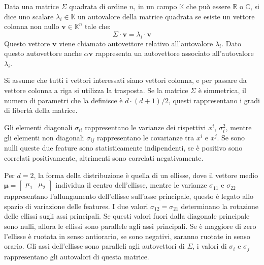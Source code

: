 \documentclass{article}
\numberwithin{equation}{subsection}
\newcommand{\vect}[1]{\boldsymbol{\mathbf{#1}}}
\begin{document}
Data una matrice $\Sigma$ quadrata di ordine $n$, in un campo $\mathbb{K}$ che può essere $\mathbb{R}$ o $\mathbb{C}$, si dice uno scalare $\lambda_i\in\mathbb{K}$ un autovalore della matrice quadrata se esiste un vettore colonna non nullo $\vect{v}\in\mathbb{K}^n$ tale che:
\begin{equation*}
    \Sigma\cdot\vect{v}=\lambda_i\cdot\vect{v}
\end{equation*}
Questo vettore $\vect{v}$ viene chiamato autovettore relativo all'autovalore $\lambda_i$. 
Dato questo autovettore anche $\alpha\vect{v}$ rappresenta un autovettore associato all'autovalore $\lambda_i$. 

Si assume che tutti i vettori interessati siano vettori colonna, e per passare da vettore colonna a riga si utilizza la trasposta. Se la matrice $\Sigma$ è simmetrica, il numero di 
parametri che la definisce è $d\cdot(d+1)/2$, questi rappresentano i gradi di libertà della matrice. 

Gli elementi diagonali $\sigma_{ii}$ rappresentano le varianze dei rispettivi $x^i$, $\sigma_i^2$, mentre gli elementi non diagonali $\sigma_{ij}$ rappresentano le covarianze tra $x^i$ e $x^j$. Se sono nulli queste due feature sono statisticamente indipendenti, se è positivo sono correlati positivamente, altrimenti sono correlati negativamente. 

Per $d=2$, la forma della distribuzione è quella di un ellisse, dove il vettore medio $\vect{\mu}=\begin{bmatrix}\mu_1&\mu_2\end{bmatrix}$ individua il centro dell'ellisse, mentre le varianze $\sigma_{11}$ e $\sigma_{22}$ rappresentano l'allungamento dell'ellisse sull'asse 
principale, questo è legato allo spazio di variazione delle features. 
I due valori $\sigma_{12}=\sigma_{21}$ determinano la rotazione delle ellissi sugli assi principali. Se questi valori fuori dalla diagonale principale sono nulli, allora le ellissi sono parallele agli assi principali. Se è maggiore di zero l'ellisse è ruotata in senso antiorario, se sono negativi, saranno ruotate in senso orario. 
Gli assi dell'ellisse sono paralleli agli autovettori di $\Sigma$, i valori di $\sigma_i$ e $\sigma_j$ rappresentano gli autovalori di questa matrice. 
\end{document}
